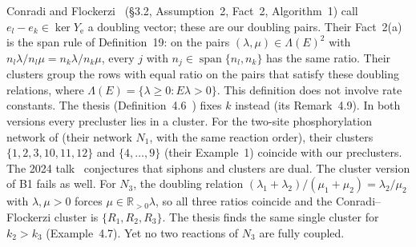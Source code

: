 \documentclass[11pt,a4paper]{report}
\providecommand{\R}{\mathbb{R}}
\newcommand{\Ye}{Y_{\mathrm e}}
\newcommand{\spn}{\operatorname{span}}
\begin{document}
\begin{remark}[clusters]\label{rem:clusters}
Conradi and Flockerzi~\autocite{ConradiFlockerzi2012} (§3.2, Assumption~2, Fact~2, Algorithm~1) call
\(e_l-e_k\in\ker\Ye\) a doubling vector; these are our doubling pairs. Their Fact~2(a) is the span rule of
Definition~19: on the pairs \((\lambda,\mu)\in\Lambda(E)^2\) with
\(n_l\lambda/n_l\mu=n_k\lambda/n_k\mu\), every \(j\) with \(n_j\in\spn\{n_l,n_k\}\) has the same ratio. Their
clusters group the rows with equal ratio on the pairs that satisfy these doubling relations, where
\(\Lambda(E)=\{\lambda\ge0:E\lambda>0\}\). This definition does not involve rate constants. The thesis
(Definition~4.6~\autocite{Iosif2019}) fixes \(k\) instead (its Remark~4.9). In both versions every precluster lies in a
cluster. For the two-site phosphorylation network of  (their network \(N_1\), with the same
reaction order), their clusters \(\{1,2,3,10,11,12\}\) and \(\{4,\dots,9\}\) (their Example~1) coincide with our
preclusters. The 2024 talk~\autocite{Iosif2024talk} conjectures that siphons and clusters are dual. The cluster
version of B1 fails as well. For \(N_3\), the doubling relation \((\lambda_1+\lambda_2)/(\mu_1+\mu_2)=\lambda_2/\mu_2\)
with \(\lambda,\mu>0\) forces \(\mu\in\R_{>0}\lambda\), so all three ratios coincide and the Conradi--Flockerzi
cluster is \(\{R_1,R_2,R_3\}\). The thesis finds the same single cluster for \(k_2>k_3\) (Example~4.7). Yet no two
reactions of \(N_3\) are fully coupled.
\end{remark}
\end{document}
